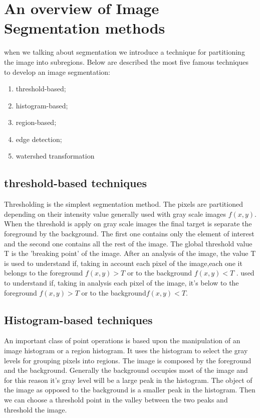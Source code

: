 \section{An overview of Image Segmentation methods}
when we talking about segmentation we introduce a technique for partitioning the image into subregions. Below are described the most five famous techniques to develop an image segmentation:
\begin{enumerate}
	\item threshold-based;
	\item histogram-based;
	\item region-based;
	\item edge detection;
	\item watershed transformation
\end{enumerate}
\subsection{threshold-based techniques}
Thresholding is the simplest segmentation method. The pixels are partitioned depending on their intensity value generally used with gray scale images $f(x,y)$. When the threshold is apply on gray scale images the final target is separate the foreground by the background. The first one contains only the element of interest and the second one contains all the rest of the image. The global threshold value T is the 'breaking point' of the image. After an analysis of the image, the value T is used to understand if, taking in account each pixel of the image,each one it belongs to the foreground $f(x, y) > T$ or to the background $f(x, y) < T$ . used to understand if, taking in analysis each pixel of the image, it's below to the foreground $f(x, y) > T$ or to the background$f(x, y) < T$.\cite{Threshold}

\subsection{Histogram-based techniques}
An important class of point operations is based upon the manipulation of an image histogram or a region histogram. It uses the histogram to select the gray levels for grouping pixels into regions. The image is composed by the foreground and the background. Generally the background occupies most of the image and for this reason it's gray level will be a large peak in the histogram. The object of the image as opposed to the background is a smaller peak in the histogram. Then we can choose a threshold point in the valley between the two peaks and threshold the image.

